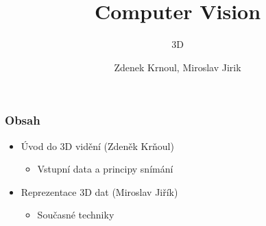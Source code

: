 \title{Computer Vision}
\subtitle{3D}
\author{Zdenek Krnoul, Miroslav Jirik}

\date{} %



\begingroup 
{}

\begin{frame}
	\titlepage
\end{frame}

\addtocounter{framenumber}{-1}
\expandafter\def\expandafter\insertshorttitle\expandafter{%
	\insertshorttitle \hfill \insertframenumber\,/\,\inserttotalframenumber
}


\begin{frame}
\frametitle{Obsah}
\begin{itemize}
	\item Úvod do 3D vidění (Zdeněk Krňoul)
    \begin{itemize}
        \item Vstupní data a principy snímání
    \end{itemize}
    \item Reprezentace 3D dat (Miroslav Jiřík)
    \begin{itemize}
    \item Současné techniky 
    \end{itemize}
\end{itemize}
\end{frame}

